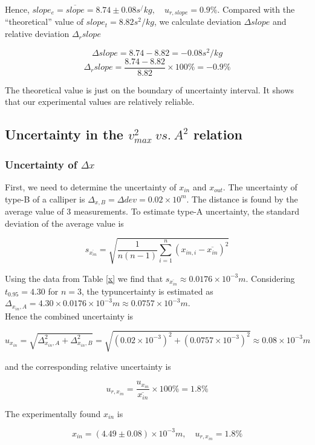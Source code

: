 Hence, $slope_e=\overline{slope}=8.74\pm 0.08s^/kg, \quad u_{r,slope}=0.9\%$. 
Compared with the ``theoretical'' value of $slope_t=8.82s^2/kg$,
we calculate deviation $\Delta slope$ and relative deviation $\Delta_r slope$

 $$   \Delta slope=8.74-8.82=-0.08s^2/kg        $$
 $$   \Delta_r slope=\frac{8.74-8.82}{8.82}\times 100\%=-0.9\%     $$

The theoretical value is just on the boundary of uncertainty interval. It shows that our experimental values are relatively reliable.

\subsection{Uncertainty in the $v_{max}^2\ vs.\ A^2$ relation}

\subsubsection{Uncertainty of $\Delta x$}
First, we need to determine the uncertainty of $x_{in}$ and $x_{out}$. The uncertainty of type-B of a calliper is $\Delta_{x,B}=\Delta{dev}=0.02\times10^m$. The distance is found by the average value of 3 measurements. To estimate  type-A uncertainty, the standard deviation of the average value is 

$$   s_{\overline{x_{in}}}=\sqrt{\frac{1}{n(n-1)}\sum_{i=1}^n(x_{in,i}-\overline{x_{in}})^2} $$

Using the data from Table \ref{x} we find that $s_{\overline{x_{in}}}\approx 0.0176\times10^{-3}m$. Considering $t_{0.95}=4.30$ for $n=3$, the typuncertainty is estimated as $\Delta_{x_{in},A}=4.30\times0.0176\times10^{-3}m\approx 0.0757\times10^{-3}m$.\\
Hence the combined uncertainty is

$$  u_{x_{in}}=\sqrt{\Delta_{x_{in},A}^2+\Delta_{x_{in},B}^2}=\sqrt{(0.02\times10^{-3})^2+(0.0757\times10^{-3})^2}\approx 0.08\times10^{-3}m$$

 and the corresponding relative uncertainty is 

$$  u_{r,x_{in}}=\frac{u_{x_{in}}}{\overline{x_{in}}}\times 100\%=1.8\%$$

The experimentally found $x_{in}$ is 

$$    x_{in}=(4.49\pm 0.08) \times10^{-3}m,\quad u_{r,x_{in}}=1.8\%$$

